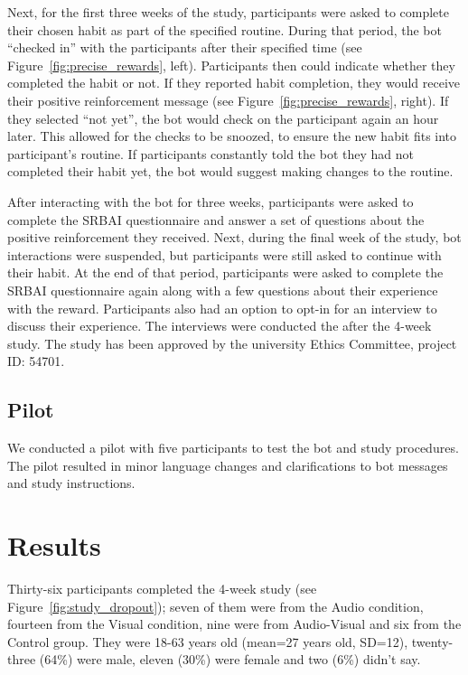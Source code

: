 \documentclass{scaffold/sigchi}
\begin{document}
Next, for the first three weeks of the study, participants were asked to complete their chosen habit as part of the specified routine. During that period, the bot ``checked in'' with the participants after their specified time (see Figure~\ref{fig:precise_rewards}, left). Participants then could indicate whether they completed the habit or not. If they reported habit completion, they would receive their positive reinforcement message (see Figure~\ref{fig:precise_rewards}, right). If they selected ``not yet'', the bot would check on the participant again an hour later. This allowed for the checks to be snoozed, to ensure the new habit fits into participant's routine. If participants constantly told the bot they had not completed their habit yet, the bot would suggest making changes to the routine.

After interacting with the bot for three weeks, participants were asked to complete the SRBAI questionnaire and answer a set of questions about the positive reinforcement they received. Next, during the final week of the study, bot interactions were suspended, but participants were still asked to continue with their habit. At the end of that period, participants were asked to complete the SRBAI questionnaire again along with a few questions about their experience with the reward. Participants also had an option to opt-in for an interview to discuss their experience. The interviews were conducted the after the 4-week study. The study has been approved by the university Ethics Committee, project ID: 54701.



\subsection{Pilot}
We conducted a pilot with five participants to test the bot and study procedures. The pilot resulted in minor language changes and clarifications to bot messages and study instructions.

\section{Results}
Thirty-six participants completed the 4-week study (see Figure~\ref{fig:study_dropout}); seven of them were from the Audio condition, fourteen from the Visual condition, nine were from Audio-Visual and six from the Control group. They were 18-63 years old (mean=27 years old, SD=12), twenty-three (64\%) were male, eleven (30\%) were female and two (6\%) didn't say. 
\end{document}
